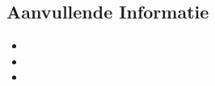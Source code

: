 \documentclass[11pt,a4paper]{article}
\begin{document}
\begin{itemize}[leftmargin=0pt,label={},itemsep=2em,topsep=0pt]
\section{Aanvullende Informatie}
\begin{itemize}[leftmargin=*]
\item \OtherAvailabilityNL
\item \OtherDrivingLicenseNL
\item \OtherRelocationNL
\end{itemize}

\end{itemize}
\end{document}
